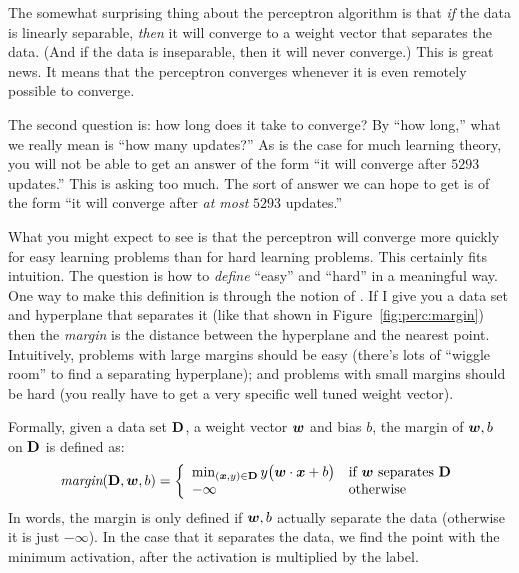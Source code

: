 The somewhat surprising thing about the perceptron algorithm is that
\emph{if} the data is linearly separable, \emph{then} it will converge
to a weight vector that separates the data.  (And if the data is
inseparable, then it will never converge.)  This is great news.  It
means that the perceptron converges whenever it is even remotely
possible to converge.

The second question is: how long does it take to converge?  By ``how
long,'' what we really mean is ``how many updates?''  As is the case
for much learning theory, you will not be able to get an answer of the
form ``it will converge after $5293$ updates.''  This is asking too
much.  The sort of answer we can hope to get is of the form ``it will
converge after \emph{at most} $5293$ updates.''

What you might expect to see is that the perceptron will converge more
quickly for easy learning problems than for hard learning problems.
This certainly fits intuition.  The question is how to \emph{define}
``easy'' and ``hard'' in a meaningful way.  One way to make this
definition is through the notion of .  If I give you a
data set and hyperplane that separates it (like that shown in
Figure~\ref{fig:perc:margin}) then the \emph{margin} is the distance
between the hyperplane and the nearest point.  Intuitively, problems
with large margins should be easy (there's lots of ``wiggle room'' to
find a separating hyperplane); and problems with small margins should
be hard (you really have to get a very specific well tuned weight
vector).

Formally, given a data set $\text{\bf D}$, a weight vector ${\boldsymbol{w}}$ and bias
$b$, the margin of ${\boldsymbol{w}},b$ on $\text{\bf D}$ is defined as:
\begin{equation} \label{eq:margin}
\textit{margin}(\text{\bf D}, {\boldsymbol{w}}, b)
= \left\{\begin{array}{ll}
     \min_{({\boldsymbol{x}},y) \in \text{\bf D}} y \big( {\boldsymbol{w}} \cdot {\boldsymbol{x}} + b \big)
      & \text{if ${\boldsymbol{w}}$ separates $\text{\bf D}$} \\
    -\infty & \text{otherwise}
\end{array}\right.
\end{equation}
In words, the margin is only defined if ${\boldsymbol{w}},b$ actually separate the
data (otherwise it is just $-\infty$).  In the case that it separates
the data, we find the point with the minimum activation, after the
activation is multiplied by the label.

